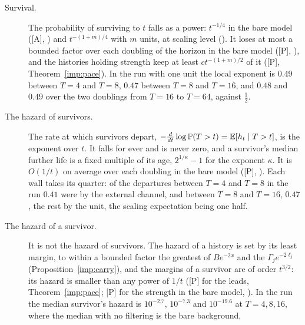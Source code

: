 \begin{description}
\item[Survival.] The probability of surviving to $t$ falls as a power:
$t^{-1/4}$ in the bare model ([A], \cite{GoldenSurvivorship}) and $t^{-(1+m)/4}$ with $m$
units, at scaling level (\cite{GoldenSurvivorship}). It loses at most a bounded factor
over each doubling of the horizon in the bare model ([P], \cite{GoldenSurvivorship}),
and the histories holding strength keep at least $ct^{-(1+m)/2}$ of it
([P], Theorem~\ref{imp:pace}). In the run with one unit the local exponent is $0.49$
between $T=4$ and $T=8$, $0.47$ between $T=8$ and $T=16$, and $0.48$ and $0.49$ over the two doublings from $T=16$ to $T=64$, against
$\tfrac12$.
\item[The hazard of survivors.] The rate at which survivors depart,
$-\frac{d}{dt}\log\mathbb{P}(T>t)=\mathbb{E}[h_t\mid T>t]$, is the exponent over $t$. It
falls for ever and is never zero, and a survivor's median further life
is a fixed multiple of its age, $2^{1/\kappa}-1$ for the exponent $\kappa$.
It is $O(1/t)$ on average over each doubling
in the bare model ([P], \cite{GoldenSurvivorship}). Each wall takes its quarter: of the
departures between $T=4$ and $T=8$ in the run $0.41$ were by the
external channel, and between $T=8$ and $T=16$, $0.47$, the rest by
the unit, the scaling expectation being one half.
\item[The hazard of a survivor.] It is not the hazard of survivors. The
hazard of a history is set by its least margin, to within a bounded
factor the greatest of $Be^{-2x}$ and the $\Gamma_je^{-2\ell_j}$
(Proposition~\ref{imp:carry}), and the margins of a survivor are of order $t^{3/2}$: its
hazard is smaller than any power of $1/t$ ([P] for the leads, Theorem~\ref{imp:pace};
[P] for the strength in the bare model, \cite{GoldenSurvivorship}). In the run the
median survivor's hazard is $10^{-2.7}$, $10^{-7.3}$ and $10^{-19.6}$
at $T=4,8,16$, where the median with no filtering is the bare background,

\end{description}
